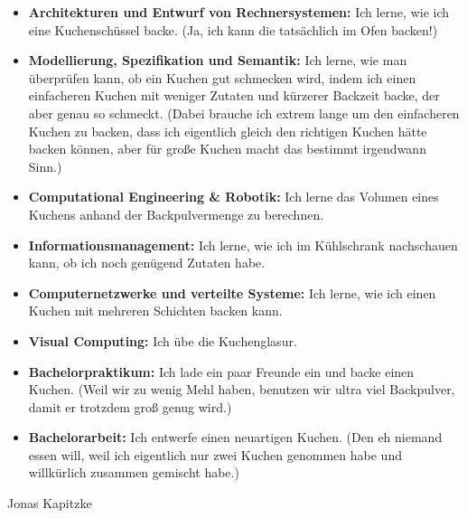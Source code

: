 {\begin{itemize}
	backen kann, der garantiert nicht anbrennt.
	\item \textbf{Architekturen und Entwurf von Rechnersystemen:} Ich lerne,
	wie ich eine Kuchenschüssel backe. (Ja, ich kann die tatsächlich im Ofen
	backen!)
	\item \textbf{Modellierung, Spezifikation und Semantik:} Ich lerne, wie
		man überprüfen kann, ob ein Kuchen gut schmecken wird, indem ich einen
		einfacheren Kuchen mit weniger Zutaten und kürzerer Backzeit backe, der
		aber genau so schmeckt. (Dabei brauche ich extrem lange um den
		einfacheren Kuchen zu backen, dass ich eigentlich gleich den richtigen
		Kuchen hätte backen können, aber für große Kuchen macht das bestimmt
		irgendwann Sinn.)
		\item \textbf{Computational Engineering \& Robotik:} Ich lerne das
		Volumen eines Kuchens anhand der Backpulvermenge zu berechnen.
		\item \textbf{Informationsmanagement:} Ich lerne, wie ich im Kühlschrank
		nachschauen kann, ob ich noch genügend Zutaten habe.
		\item \textbf{Computernetzwerke und verteilte Systeme:}  Ich lerne, wie
			ich einen Kuchen mit mehreren Schichten backen kann.
			\item \textbf{Visual Computing:} Ich übe die Kuchenglasur.
			\item \textbf{Bachelorpraktikum:} Ich lade ein paar Freunde ein und
			backe einen Kuchen. (Weil wir zu wenig Mehl haben, benutzen wir ultra
			viel Backpulver, damit er trotzdem groß genug wird.)
			\item \textbf{Bachelorarbeit:} Ich entwerfe einen neuartigen Kuchen.
			(Den eh niemand essen will, weil ich eigentlich nur zwei Kuchen genommen
			habe und willkürlich zusammen gemischt habe.)
		\end{itemize}
}
{Jonas Kapitzke}
